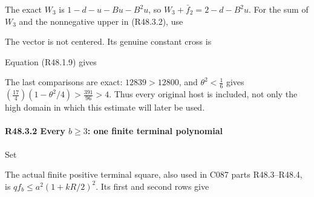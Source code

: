 The exact \(W_{3}\) is \(1-d-u-Bu-B^2u\), so \(W_{3}+\bar f_{2}=2-d-B^2u\). For the sum of \(W_{3}\) and the nonnegative upper in (R48.3.2), use


The vector is not centered. Its genuine constant cross is


Equation (R48.1.9) gives



The last comparisons are exact: \(12839>12800\), and \(\theta^2<\frac{1}{6}\) gives \((\frac{17}{4})(1-\theta^2/4)>\frac{391}{96}>4\). Thus every original host is included, not only the high domain in which this estimate will later be used.

\paragraph{R48.3.2 Every \(b \ge  3\): one finite terminal polynomial}

Set



The actual finite positive terminal square, also used in C087 parts R48.3–R48.4, is \(q f_b \le  a^2(1+kR/2)^2\). Its first and second rows give

